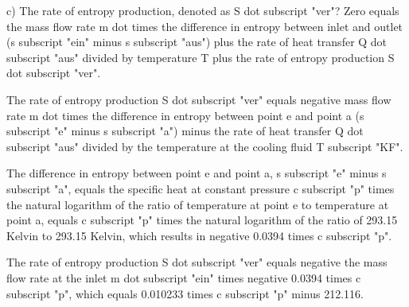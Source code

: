 c) The rate of entropy production, denoted as S dot subscript "ver"? Zero equals the mass flow rate m dot times the difference in entropy between inlet and outlet (s subscript "ein" minus s subscript "aus") plus the rate of heat transfer Q dot subscript "aus" divided by temperature T plus the rate of entropy production S dot subscript "ver".

The rate of entropy production S dot subscript "ver" equals negative mass flow rate m dot times the difference in entropy between point e and point a (s subscript "e" minus s subscript "a") minus the rate of heat transfer Q dot subscript "aus" divided by the temperature at the cooling fluid T subscript "KF".

The difference in entropy between point e and point a, s subscript "e" minus s subscript "a", equals the specific heat at constant pressure c subscript "p" times the natural logarithm of the ratio of temperature at point e to temperature at point a, equals c subscript "p" times the natural logarithm of the ratio of 293.15 Kelvin to 293.15 Kelvin, which results in negative 0.0394 times c subscript "p".

The rate of entropy production S dot subscript "ver" equals negative the mass flow rate at the inlet m dot subscript "ein" times negative 0.0394 times c subscript "p", which equals 0.010233 times c subscript "p" minus 212.116.